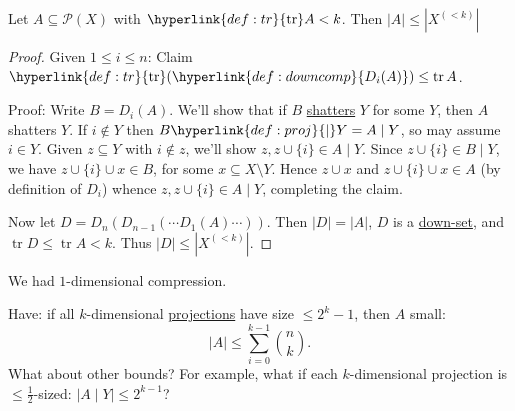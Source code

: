 \documentclass{article}
\DeclareMathOperator\tr{tr}
\newcommand{\named}[1]{\textbf{#1}\index{#1}}
\let\subset\subseteq
\begin{document}
\begin{nthm}\label{thm:3.1}
  Let $A \subset \mathcal{P}(X)$ with $\hyperlink{def:tr}{\tr} A < k$. Then $|A| \leq |X^{(<k)}|$
\end{nthm}
\begin{proof}
  Given $1 \leq i \leq n$:
  Claim $\hyperlink{def:tr}{\tr}(\hyperlink{def:downcomp}{D_i(A)}) \leq \tr A$.

  Proof: Write $B = D_i(A)$.
  We'll show that if $B$ \hyperlink{def:tr}{shatters} $Y$ for some $Y$, then $A$ shatters $Y$.
  If $i \notin Y$ then $B \hyperlink{def:proj}{\mid} Y = A \mid Y$, so may assume $i \in Y$.
  Given $z \subset Y$ with $i \notin z$, we'll show $z, z \cup \{i\} \in A \mid Y$.
  Since $z \cup \{i\} \in B \mid Y$, we have $z \cup \{i\} \cup x \in B$, for some $x \subset X \setminus Y$.
  Hence $z \cup x$ and $z \cup \{i\} \cup x \in A$ (by definition of $D_i$)
  whence $z,z \cup \{i\} \in A \mid Y$, completing the claim.

  Now let $D = D_n(D_{n-1}(\dotsb D_1(A) \dotsb))$.
  Then $|D| = |A|$, $D$ is a \hyperlink{def:downset}{down-set}, and $\tr D \leq \tr A < k$.
  Thus $|D| \leq |X^{(<k)}|$.
\end{proof}
\begin{remark}
  We had $1$-dimensional compression.
\end{remark}
Have: if all $k$-dimensional \hyperlink{def:proj}{projections} have size $\leq 2^k - 1$, then $A$ small:
\begin{equation*}|A| \leq \sum_{i=0}^{k-1} \binom{n}{k}.\end{equation*}
What about other bounds?
For example, what if each $k$-dimensional projection is $\leq \frac{1}{2}$-sized: $|A \mid Y| \leq 2^{k-1}$?
\end{document}
